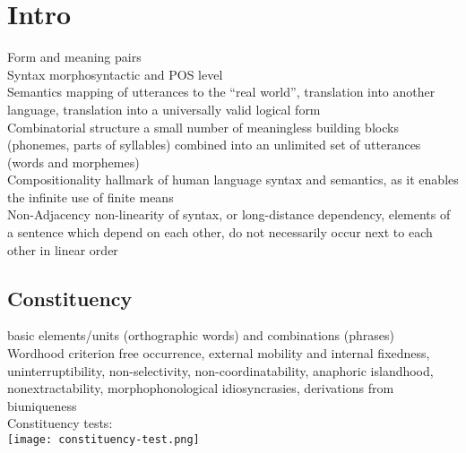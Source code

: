\section{Intro}
\scriptsize{Form and meaning pairs} \\
\scriptsize{Syntax} {\tiny morphosyntactic and POS level}\\
\scriptsize{Semantics} {\tiny mapping of utterances to the “real world”, translation into another language, translation into a universally valid logical form}\\
\scriptsize{Combinatorial structure} {\tiny a small number of meaningless building blocks (phonemes, parts of syllables) combined into an unlimited set of utterances (words and morphemes)}\\
\scriptsize{Compositionality} {\tiny hallmark of human language syntax and semantics, as it enables the infinite use of finite means}\\
\scriptsize{Non-Adjacency} {\tiny non-linearity of syntax, or long-distance dependency, elements of a sentence which depend on each other, do not necessarily
occur next to each other in linear order}
\subsection*{Constituency}
{\tiny basic elements/units (orthographic words) and combinations (phrases)}\\
\scriptsize{Wordhood criterion} {\tiny free occurrence, external mobility and internal fixedness, uninterruptibility, non-selectivity, non-coordinatability, anaphoric islandhood, nonextractability, morphophonological idiosyncrasies, derivations from biuniqueness}\\
\scriptsize{Constituency tests:}\\
\texttt{[image: constituency-test.png]}\\
